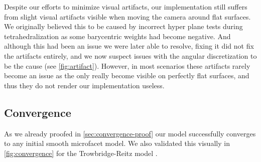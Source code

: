 Despite our efforts to minimize visual artifacts, our implementation still suffers from slight visual artifacts visible when moving the camera around flat surfaces.
%
We originally believed this to be caused by incorrect hyper plane tests during tetrahedralization as some barycentric weights had become negative.
%
And although this had been an issue we were later able to resolve, fixing it did not fix the artifacts entirely, and we now suspect issues with the angular discretization to be the cause (see \cref{fig:artifact}).
%
However, in most scenarios these artifacts rarely become an issue as the only really become visible on perfectly flat surfaces, and thus they do not render our implementation useless.

\subsection{Convergence}
\label{sec:convergence}



As we already proofed in \cref{sec:convergence-proof} our model successfully converges to any initial smooth microfacet model.
%
We also validated this visually in \cref{fig:convergence} for the Trowbridge-Reitz model \parencite{trowbridge1975, walter2007}.

